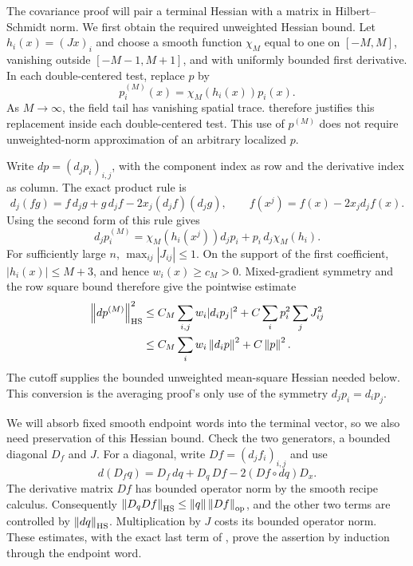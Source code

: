The covariance proof will pair a terminal Hessian with a matrix in
Hilbert--Schmidt norm. We first obtain the required unweighted Hessian
bound. Let $h_i(x)=(Jx)_i$ and choose a smooth function $\chi_M$ equal to one
on $[-M,M]$, vanishing outside $[-M-1,M+1]$, and with uniformly bounded
first derivative. In each double-centered test, replace $p$ by
\[
 p^{(M)}_i(x)=\chi_M(h_i(x))p_i(x).
\]
As $M\to\infty$, the field tail has vanishing spatial trace.
 therefore justifies this replacement
inside each double-centered test. This use of $p^{(M)}$ does not
require unweighted-norm approximation of an arbitrary localized $p$.

Write $dp=(d_jp_i)_{i,j}$, with the component index as row and the
derivative index as column. The exact product rule is
\begin{equation}\label{eq:hidden-product-rule}
 d_j(fg)=f\,d_jg+g\,d_jf-2x_j(d_jf)(d_jg),
 \qquad f(x^j)=f(x)-2x_jd_jf(x).
\end{equation}
Using the second form of this rule gives
\[
 d_jp_i^{(M)}
 =\chi_M(h_i(x^j))d_jp_i+p_i\,d_j\chi_M(h_i).
\]
For sufficiently large $n$, $\max_{ij}|J_{ij}|\leq1$. On the support
of the first coefficient, $|h_i(x)|\leq M+3$, and hence
$w_i(x)\geq c_M>0$. Mixed-gradient symmetry and the row square bound
therefore give the pointwise estimate
\begin{align}
 \left\lVert dp^{(M)}\right\rVert_{\mathrm{HS}}^2
 &\leq C_M\sum_{i,j}w_i|d_ip_j|^2
       +C\sum_i p_i^2\sum_jJ_{ij}^2\notag\\
 &\leq C_M\sum_i w_i\left\lVert d_ip\right\rVert^2+C\left\lVert p\right\rVert^2.
 \label{eq:hidden-cutoff-hessian}
\end{align}
The cutoff supplies the bounded unweighted mean-square Hessian
needed below. This conversion is the averaging proof's only use of
the symmetry $d_jp_i=d_ip_j$.

We will absorb fixed smooth endpoint words into the terminal vector,
so we also need preservation of this Hessian bound. Check the two
generators, a bounded diagonal $D_f$ and $J$. For a diagonal, write
$Df=(d_jf_i)_{i,j}$ and use
\begin{equation}\label{eq:hidden-matrix-product-rule}
 d(D_fq)=D_f\,dq+D_q\,Df-2(Df\circ dq)D_x.
\end{equation}
The derivative matrix $Df$ has bounded operator norm by the smooth
recipe calculus. Consequently
$\left\lVert D_qDf\right\rVert_{\mathrm{HS}}\leq\left\lVert q\right\rVert\left\lVert Df\right\rVert_{\mathrm{op}}$, and the other two
terms are controlled by $\left\lVert dq\right\rVert_{\mathrm{HS}}$. Multiplication by $J$ costs
its bounded operator norm. These estimates, with the exact last term
of , prove the assertion by
induction through the endpoint word.

